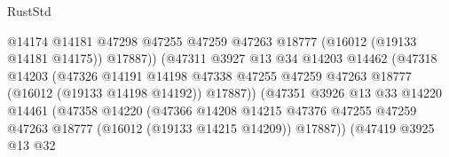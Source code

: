 \begin{lexlean}{RustStd}
\begin{coremodule}
                                            @14174
                                            @14181
                                            @47298
                                            @47255
                                            @47259
                                            @47263
                                            @18777
                                            (@16012 (@19133 @14181 @14175))
                                            @17887))
                                        (@47311
                                          @3927
                                          @13
                                          @34
                                          @14203
                                          @14462
                                          (@47318
                                            @14203
                                            (@47326
                                              @14191
                                              @14198
                                              @47338
                                              @47255
                                              @47259
                                              @47263
                                              @18777
                                              (@16012 (@19133 @14198 @14192))
                                              @17887))
                                          (@47351
                                            @3926
                                            @13
                                            @33
                                            @14220
                                            @14461
                                            (@47358
                                              @14220
                                              (@47366
                                                @14208
                                                @14215
                                                @47376
                                                @47255
                                                @47259
                                                @47263
                                                @18777
                                                (@16012 (@19133 @14215 @14209))
                                                @17887))
                                            (@47419
                                              @3925
                                              @13
                                              @32

\end{coremodule}
\end{lexlean}
